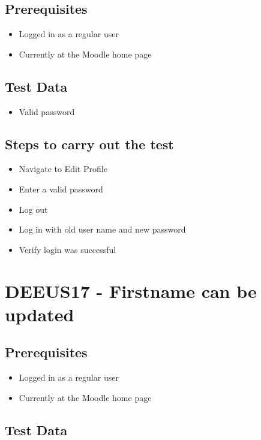 \documentclass{article}
\begin{document}
\subsection*{Prerequisites}

\begin{itemize}
  \item Logged in as a regular user
  \item Currently at the Moodle home page
\end{itemize}

\subsection*{Test Data}

\begin{itemize}
  \item Valid password
\end{itemize}

\subsection*{Steps to carry out the test}

\begin{itemize}
  \item Navigate to Edit Profile
  \item Enter a valid password
  \item Log out
  \item Log in with old user name and new password
  \item Verify login was successful
\end{itemize}

\section*{DEEUS17 - Firstname can be updated}

\subsection*{Prerequisites}

\begin{itemize}
  \item Logged in as a regular user
  \item Currently at the Moodle home page
\end{itemize}

\subsection*{Test Data}
\end{document}
